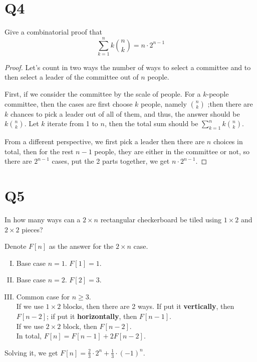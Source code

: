 \documentclass[a4paper,11pt]{article}
\begin{document}
\section*{Q4}
Give a combinatorial proof that
\begin{equation*}
  \sum_{k=1}^{n }k\binom{n }{k}=n\cdot 2^{n-1}
\end{equation*}
\begin{proof}
    Let's count in two ways the number of ways to select a
committee and to then select a leader of the committee out of $n$ people.

First, if we consider the committee by the scale of people. For a $k$-people
committee, then the cases are first choose $k$ people, namely $\binom{n }{k}$
;then there are $k$ chances to pick a leader out of all of them, and thus, 
the answer should be $k\binom{n }{k}$. Let $k$ iterate from 1 to $n$, then the total sum should be $\sum_{k=1}^{n }k\binom{n }{k}$.

From a different perspective, we first pick a leader then there are $n$ choices in total, then for the rest $n-1$ people, they are either in the committee or not, so there are $2^{n-1}$ cases, put the 2 parts together, we get $n\cdot 2^{n-1}$.
\end{proof}

\section*{Q5}
In how many ways can a $2 \times  n$ rectangular checkerboard be
tiled using $1 \times  2$ and $2 \times  2$ pieces?
\begin{solution}
Denote $F[n]$ as the answer for the $2\times n$ case.
\begin{enumerate}[(I)]
    \item Base case $n=1$.
    $F[1]=1$.

    \item Base case $n=2$.
    $F[2]=3$.

    
    \item Common case for $n\ge 3$. \\
    If we use $1\times 2$ blocks, then there are 2 ways. If put it \textbf{vertically}, then $F[n-2]$; if put it \textbf{horizontally}, then $F[n-1]$. \\
    If we use $2\times 2$ block, then $F[n-2]$.\\
    In total, $F[n]=F[n-1]+2F[n-2]$.
\end{enumerate}
Solving it, we get $F[n]=\frac{2}{3}\cdot 2^{n}+\frac{1}{3}\cdot (-1)^{n}$.
\end{solution}
\end{document}
